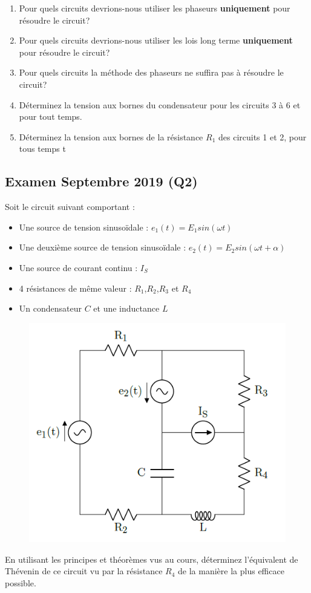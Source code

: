 \begin{enumerate}
    \item Pour quels circuits devrions-nous utiliser les phaseurs \textbf{uniquement} pour résoudre le circuit?
    \item Pour quels circuits devrions-nous utiliser les lois long terme \textbf{uniquement} pour résoudre le circuit?
    \item Pour quels circuits la méthode des phaseurs ne suffira pas à résoudre le circuit?
    \item Déterminez la tension aux bornes du condensateur pour les circuits 3 à 6 et pour tout temps.
    \item Déterminez la tension aux bornes de la résistance $R_1$ des circuits 1 et 2, pour tous temps t
\end{enumerate}

\newpage
\subsection{Examen Septembre 2019 (Q2)}

Soit le circuit suivant comportant :
\begin{itemize}
    \item Une source de tension sinusoïdale : $e_1(t) = E_1 sin(\omega t)$
    \item Une deuxième source de tension sinusoïdale : $e_2(t) = E_2 sin(\omega t+\alpha)$
    \item Une source de courant continu : $I_S$
    \item 4 résistances de même valeur : $R_1$,$R_2$,$R_3$ et $R_4$
    \item Un condensateur $C$ et une inductance $L$
\end{itemize}
\begin{figure}[h!]
    \centering
    \includegraphics[width = 14cm]{TpQEx_Circuits/Q2_Sept_2019.PNG}
    \label{fig:Q2_TheoCircuitsSept2019}
\end{figure}

En utilisant les principes et théorèmes vus au cours, déterminez l'équivalent de Thévenin de ce circuit vu par la résistance $R_4$ de la manière la plus efficace possible.

